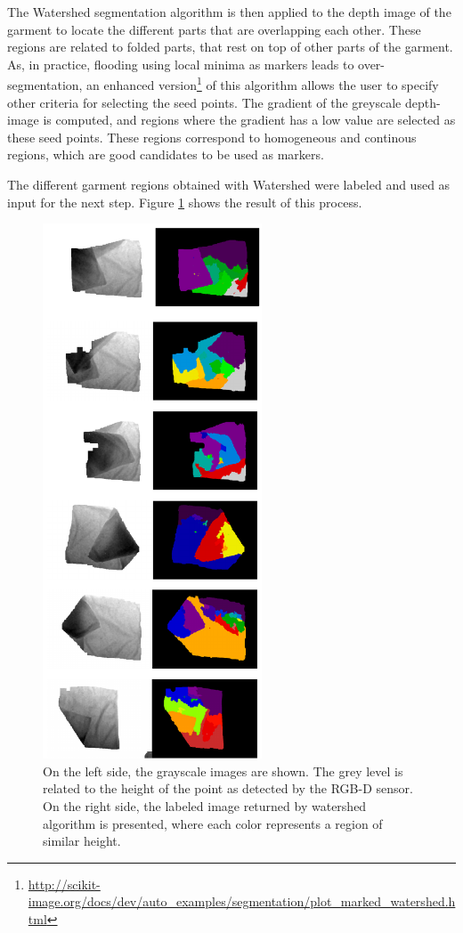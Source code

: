 The Watershed segmentation algorithm is then applied to the depth image of the garment to locate the different parts that are overlapping each other. These regions are related to folded parts, that rest on top of other parts of the garment. 
%
As, in practice, flooding using local minima as markers  leads to over-segmentation, an enhanced version\footnote{\url{http://scikit-image.org/docs/dev/auto_examples/segmentation/plot_marked_watershed.html}} of this algorithm  allows the user to specify other criteria for selecting the seed points. The gradient of the greyscale depth-image is computed, and regions where the gradient has a low value are selected as these seed points. These regions correspond to homogeneous and continous regions, which are good candidates to be used as markers.

The different garment regions obtained with Watershed were labeled and used as input for the next step. Figure \ref{fig:watershed_labels} shows the result of this process.

\begin{figure}[thpb]
    \centering
    \includegraphics[width=0.58\textwidth]{figures/colour_garment.pdf}
    \caption{On the left side, the grayscale images are shown. The grey level is related to the height of the point as detected by the RGB-D sensor. On the right side, the labeled image returned by watershed algorithm is presented, where each color represents a region of similar height.}
    \label{fig:watershed_labels}
\end{figure}
